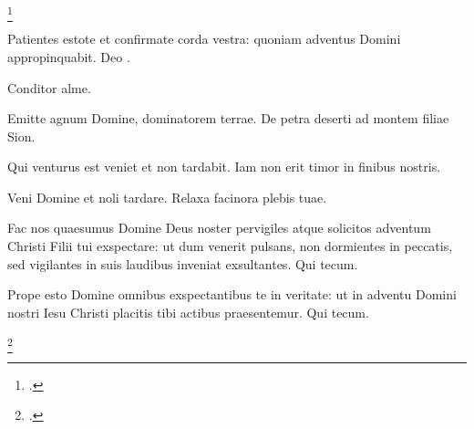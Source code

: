 
\footcite[83r]{bp1502}
\vspace{3mm}


Patientes estote et confirmate corda vestra:
quoniam adventus Domini appropinquabit.
Deo .

Conditor alme.

Emitte agnum Domine, dominatorem terrae.
De petra deserti ad montem filiae Sion.

Qui venturus est veniet et non tardabit. Iam non erit timor in finibus nostris.

Veni Domine et noli tardare. Relaxa facinora plebis tuae.

Fac nos quaesumus Domine Deus noster pervigiles atque solicitos adventum
Christi Filii tui exspectare: ut dum venerit pulsans,
non dormientes in peccatis, sed vigilantes in suis laudibus inveniat
exsultantes. Qui tecum.

Prope esto Domine omnibus exspectantibus te in veritate:
ut in adventu Domini nostri Iesu Christi placitis tibi actibus praesentemur.
Qui tecum.

\footcite[83r-83v]{bp1502}

\headingCantus

